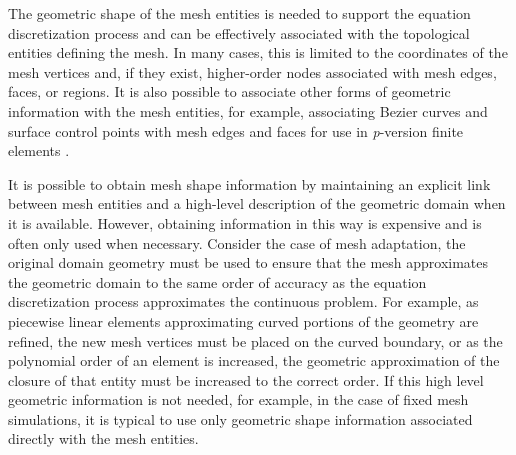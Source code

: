 

The geometric shape of the mesh entities is needed to support the
equation discretization process and can be effectively associated with
the topological entities defining the mesh. In many cases, this is
limited to the coordinates of the mesh vertices and, if they exist,
higher-order nodes associated with mesh edges, faces, or regions.  It
is also possible to associate other forms of geometric information
with the mesh entities, for example, associating Bezier curves and
surface control points with mesh edges and faces for use in {\it
p}-version finite elements \cite{LuSh02}.

It is possible to obtain mesh shape information by maintaining
an explicit link between mesh entities and a high-level description of
the geometric domain when it is available.  However, obtaining
information in this way is expensive and is often only used when
necessary.  Consider the case of mesh adaptation, the original domain
geometry must be used to ensure that the mesh approximates the
geometric domain to the same order of accuracy as the equation
discretization process approximates the continuous problem. For
example, as piecewise linear elements approximating curved portions of
the geometry are refined, the new mesh vertices must be placed on the
curved boundary, or as the polynomial order of an element is
increased, the geometric approximation of the closure of that entity
must be increased to the correct order.  If this high level geometric
information is not needed, for example, in the case of fixed mesh
simulations, it is typical to use only geometric shape information
associated directly with the mesh entities.

